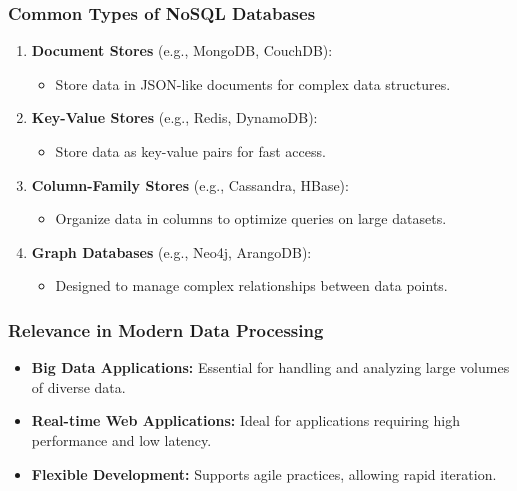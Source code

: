 \documentclass[aspectratio=169]{beamer}
\begin{document}
\begin{frame}[fragile]
    \frametitle{Common Types of NoSQL Databases}
    \begin{enumerate}
        \item \textbf{Document Stores} (e.g., MongoDB, CouchDB):
        \begin{itemize}
            \item Store data in JSON-like documents for complex data structures.
        \end{itemize}

        \item \textbf{Key-Value Stores} (e.g., Redis, DynamoDB):
        \begin{itemize}
            \item Store data as key-value pairs for fast access.
        \end{itemize}

        \item \textbf{Column-Family Stores} (e.g., Cassandra, HBase):
        \begin{itemize}
            \item Organize data in columns to optimize queries on large datasets.
        \end{itemize}

        \item \textbf{Graph Databases} (e.g., Neo4j, ArangoDB):
        \begin{itemize}
            \item Designed to manage complex relationships between data points.
        \end{itemize}
    \end{enumerate}
\end{frame}

\begin{frame}[fragile]
    \frametitle{Relevance in Modern Data Processing}
    \begin{itemize}
        \item \textbf{Big Data Applications:} Essential for handling and analyzing large volumes of diverse data.
        \item \textbf{Real-time Web Applications:} Ideal for applications requiring high performance and low latency.
        \item \textbf{Flexible Development:} Supports agile practices, allowing rapid iteration.
    \end{itemize}
\end{frame}
\end{document}
